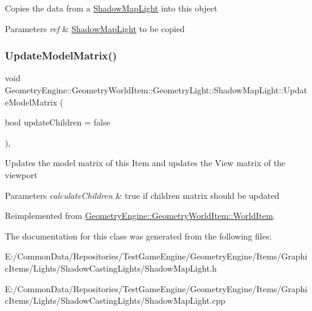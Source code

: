 Copies the data from a \mbox{\hyperlink{class_geometry_engine_1_1_geometry_world_item_1_1_geometry_light_1_1_shadow_map_light}{Shadow\+Map\+Light}} into this object 
\begin{DoxyParams}{Parameters}
{\em ref} & \mbox{\hyperlink{class_geometry_engine_1_1_geometry_world_item_1_1_geometry_light_1_1_shadow_map_light}{Shadow\+Map\+Light}} to be copied \\
\hline
\end{DoxyParams}
\mbox{\label{class_geometry_engine_1_1_geometry_world_item_1_1_geometry_light_1_1_shadow_map_light_a0465932bd0494929e5daa10ce8b77aa6}} 
\subsubsection{\texorpdfstring{UpdateModelMatrix()}{UpdateModelMatrix()}}
{\footnotesize\ttfamily void Geometry\+Engine\+::\+Geometry\+World\+Item\+::\+Geometry\+Light\+::\+Shadow\+Map\+Light\+::\+Update\+Model\+Matrix (\begin{DoxyParamCaption}\item[{bool}]{update\+Children = {\ttfamily false} }\end{DoxyParamCaption})\hspace{0.3cm}{\ttfamily [override]}, {\ttfamily [virtual]}}

Updates the model matrix of this Item and updates the View matrix of the viewport 
\begin{DoxyParams}{Parameters}
{\em calculate\+Children} & true if children matrix should be updated \\
\hline
\end{DoxyParams}


Reimplemented from \mbox{\hyperlink{class_geometry_engine_1_1_geometry_world_item_1_1_world_item_a86effd24c41c87be8925ee3addd8c33d}{Geometry\+Engine\+::\+Geometry\+World\+Item\+::\+World\+Item}}.



The documentation for this class was generated from the following files\+:\begin{DoxyCompactItemize}
\item 
E\+:/\+Common\+Data/\+Repositories/\+Test\+Game\+Engine/\+Geometry\+Engine/\+Items/\+Graphic\+Items/\+Lights/\+Shadow\+Casting\+Lights/Shadow\+Map\+Light.\+h\item 
E\+:/\+Common\+Data/\+Repositories/\+Test\+Game\+Engine/\+Geometry\+Engine/\+Items/\+Graphic\+Items/\+Lights/\+Shadow\+Casting\+Lights/Shadow\+Map\+Light.\+cpp\end{DoxyCompactItemize}
